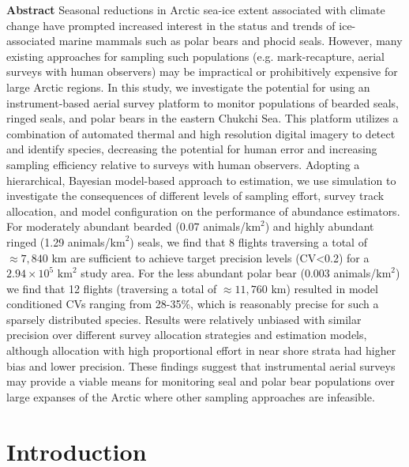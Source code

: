 \documentclass[]{rsos}%
\begin{document}
{\bf Abstract} Seasonal reductions in Arctic sea-ice extent associated with climate change have prompted increased interest in the status and trends of ice-associated marine mammals such as polar bears and phocid seals.  However, many existing approaches for sampling such populations (e.g. mark-recapture, aerial surveys with human observers) may be impractical or prohibitively expensive for large Arctic regions.  In this study, we investigate the potential for using an instrument-based aerial survey platform to monitor populations of bearded seals, ringed seals, and polar bears in the eastern Chukchi Sea. This platform utilizes a combination of automated thermal and high resolution digital imagery to detect and identify species, decreasing the potential for human error and increasing sampling efficiency relative to surveys with human observers. Adopting a hierarchical, Bayesian model-based approach to estimation, we use simulation to investigate the consequences of different levels of sampling effort, survey track allocation, and model configuration on the performance of abundance estimators. For moderately abundant bearded (0.07 animals/$\text{km}^2$) and highly abundant ringed  (1.29 animals/$\text{km}^2$) seals, we find that 8 flights traversing a total of $\approx 7,840$ km are sufficient to achieve target precision levels (CV<0.2) for a $2.94 \times 10^5$ $\text{km}^2$ study area.  For the less abundant polar bear (0.003 animals/$\text{km}^2$) we find that 12 flights (traversing a total of $\approx 11,760$ km) resulted in model conditioned CVs ranging from 28-35\%, which is reasonably precise for such a sparsely distributed species. Results were relatively unbiased with similar precision over different survey allocation strategies and estimation models, although allocation with high proportional effort in near shore strata had higher bias and lower precision.  These findings suggest that instrumental aerial surveys may provide a viable means for monitoring seal and polar bear populations over large expanses of the Arctic where other sampling approaches are infeasible.


\section{Introduction}
\end{document}
